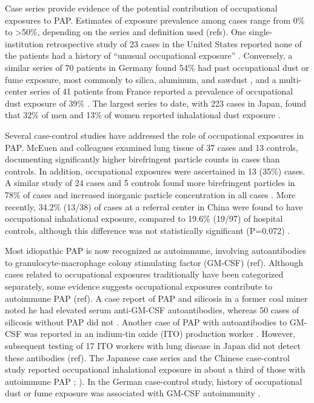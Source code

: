 \documentclass[a4paper,12pt]{article}
\begin{document}
Case series provide evidence of the potential contribution of occupational exposures to PAP.  Estimates of exposure prevalence among cases range from 0\% to >50\%, depending on the series and definition used (refs).  One single-institution retrospective study of 23 cases in the United States reported none of the patients had a history of “unusual occupational exposure” \cite{Kariman1984}.  Conversely, a similar series of 70 patients in Germany found 54\% had past occupational dust or fume
exposure, most commonly to silica, aluminum, and sawdust \cite{Bonella2011}, and a multi-center series of 41 patients from France reported a prevalence of occupational dust exposure of 39\% \cite{Briens2002}.  The largest series to date, with 223 cases in Japan, found that 32\% of men and 13\% of women reported inhalational dust exposure \cite{Inoue2008}.  

Several case-control studies have addressed the role of occupational exposures in PAP.  McEuen and colleagues \cite{McEuen1978} examined lung tissue of 37 cases and 13 controls, documenting significantly higher birefringent particle counts in cases than controls.  In addition, occupational exposures were ascertained in 13 (35\%) cases.  A similar study of 24 cases and 5 controls found more birefringent particles in 78\% of cases and increased inorganic particle concentration
in all cases \cite{Abraham1986}.  More recently, 34.2\% (13/38) of cases at a referral center in China were found to have occupational inhalational exposure, compared to 19.6\% (19/97) of hospital controls, although this difference was not statistically significant (P=0.072) \cite{Xiao2015}.   

Most idiopathic PAP is now recognized as autoimmune, involving autoantibodies to granulocyte-macrophage colony stimulating factor (GM-CSF) (ref).  Although cases related to occupational exposures traditionally have been categorized separately, some evidence suggests occupational exposures contribute to autoimmune PAP (ref).  A case report of PAP and silicosis in a former coal miner noted he had elevated serum anti-GM-CSF autoantibodies, whereas 50 cases of silicosis without PAP did
not \cite{Hosokawa2004}.  Another case of PAP with autoantibodies to GM-CSF was reported in an indium-tin oxide (ITO) production worker \cite{Cummings2010}.  However, subsequent testing of 17 ITO workers with lung disease in Japan did not detect these antibodies (ref).  The Japanese case series and the Chinese case-control study reported occupational inhalational exposure in about a third of those with autoimmune PAP \cite{Inoue2008}; \cite{Xiao2015}).  In the German case-control study, history of
occupational dust or fume exposure was associated with GM-CSF autoimmunity \cite{Bonella2011}.  
\end{document}
